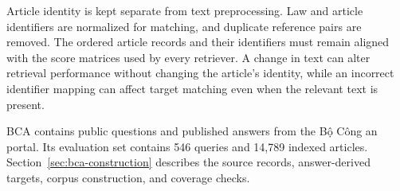 Article identity is kept separate from text preprocessing. Law and article identifiers are normalized for matching, and duplicate reference pairs are removed. The ordered article records and their identifiers must remain aligned with the score matrices used by every retriever. A change in text can alter retrieval performance without changing the article's identity, while an incorrect identifier mapping can affect target matching even when the relevant text is present.

BCA contains public questions and published answers from the Bộ Công an portal. Its evaluation set contains 546 queries and 14,789 indexed articles. Section~\ref{sec:bca-construction} describes the source records, answer-derived targets, corpus construction, and coverage checks.
